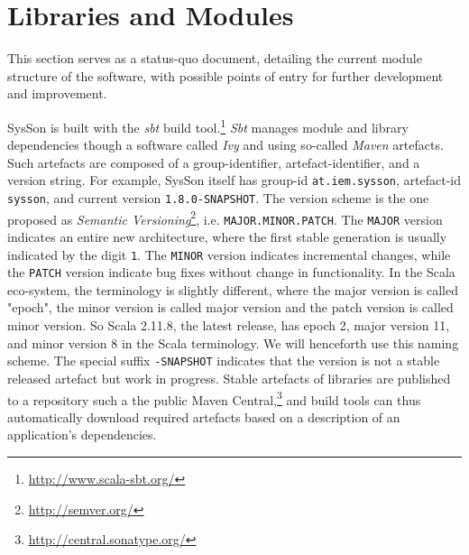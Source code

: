 \documentclass[11pt,a4paper]{article}
\newcommand{\software}[1]{\textit{#1}}
\newcommand{\sysson}[0]{SysSon}
\begin{document}
\section{Libraries and Modules}

This section serves as a status-quo document, detailing the current module structure of the software, with possible points of entry for further development and improvement.

\sysson{} is built with the \software{sbt} build tool.\footnote{\url{http://www.scala-sbt.org/}} \software{Sbt} manages module and library dependencies though a software called \software{Ivy} and using so-called \software{Maven} artefacts. Such artefacts are composed of a group-identifier, artefact-identifier, and a version string. For example, \sysson{} itself has group-id \verb!at.iem.sysson!, artefact-id \verb!sysson!, and current version \verb!1.8.0-SNAPSHOT!. The version scheme is the one proposed as \emph{Semantic Versioning}\footnote{\url{http://semver.org/}}, i.e. \verb!MAJOR.MINOR.PATCH!. The \verb!MAJOR! version indicates an entire new architecture, where the first stable generation is usually indicated by the digit \verb!1!. The \verb!MINOR! version indicates incremental changes, while the \verb!PATCH! version indicate bug fixes without change in functionality. In the Scala eco-system, the terminology is slightly different, where the major version is called "epoch", the minor version is called major version and the patch version is called minor version. So Scala 2.11.8, the latest release, has epoch 2, major version 11, and minor version 8 in the Scala terminology. We will henceforth use this naming scheme. The special suffix \verb!-SNAPSHOT! indicates that the version is not a stable released artefact but work in progress. Stable artefacts of libraries are published to a repository such a the public Maven Central,\footnote{\url{http://central.sonatype.org/}} and build tools can thus automatically download required artefacts based on a description of an application's dependencies.
\end{document}
